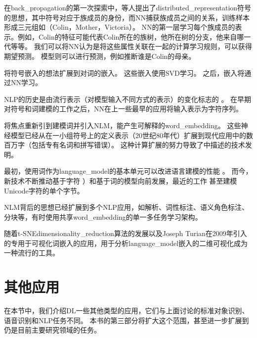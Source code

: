在\gls{back_propagation}的第一次探索中，\citet{Rumelhart86b-small}等人提出了\gls{distributed_representation}符号的思想，其中符号对应于族成员的身份，而\gls{NN}捕获族成员之间的关系，训练样本形成三元组如（Colin，Mother，Victoria）。
\gls{NN}的第一层学习每个族成员的表示。例如，Colin的特征可能代表Colin所在的族树，他所在树的分支，他来自哪一代等等。
我们可以将\gls{NN}认为是将这些属性关联在一起的计算学习规则，可以获得期望预测。
模型则可以进行预测，例如推断谁是Colin的母亲。

\cite{Deerwester90}将符号嵌入的想法扩展到对词的嵌入。
这些嵌入使用SVD学习。 
之后，嵌入将通过\gls{NN}学习。

\gls{NLP}的历史是由流行表示（对模型输入不同方式的表示）的变化标志的  。
在早期对符号和词建模的工作之后，\gls{NN}在上一些最早的应用\citep{Miikkulainen91,Schmidhuber96}将输入表示为字符序列。

\citet{BenDucVin01-small} 将焦点重新引到建模词并引入\gls{NLM}，能产生可解释的\gls{word_embedding}。
这些神经模型已经从在一小组符号上的定义表示（20世纪80年代）扩展到现代应用中的数百万字（包括专有名词和拼写错误）。
这种计算扩展的努力导致了中描述的技术发明。


最初，使用词作为\gls{language_model}的基本单元可以改进语言建模的性能 \citep{BenDucVin01-small}。
而今，新技术不断推动基于字符 \citep{Sutskever-et-al-ICML2011}）和基于词的模型向前发展，最近的工作 \citep{gillick2015multilingual}甚至建模Unicode字符的单个字节。

\gls{NLM}背后的思想已经扩展到多个\gls{NLP}应用，如解析\citep{Henderson-NAACL2003,Henderson-ACL2004,Collobert-AISTATS2011}、词性标注、语义角色标注、分块等，有时使用共享\gls{word_embedding}的单一多任务学习架构\citep{Collobert+Weston-ICML2008,collobert2011natural}。

随着t-SNE\gls{dimensionality_reduction}算法的发展\citep{VanDerMaaten08-small}以及Joseph Turian在2009年引入的专用于可视化词嵌入的应用，用于分析\gls{language_model}嵌入的二维可视化成为一种流行的工具。

\section{其他应用}
\label{sec:other_applications}

在本节中，我们介绍\gls{DL}一些其他类型的应用，它们与上面讨论的标准对象识别、语音识别和\gls{NLP}任务不同。
本书的第三部分将扩大这个范围，甚至进一步扩展到仍是目前主要研究领域的任务。



